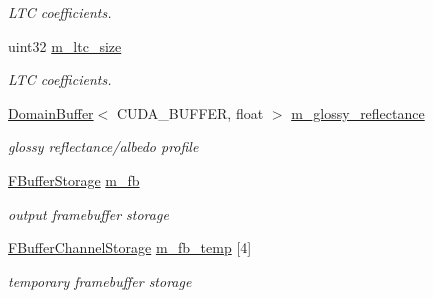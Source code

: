 \begin{DoxyCompactItemize}
\begin{DoxyCompactList}\small\item\em L\+TC coefficients. \end{DoxyCompactList}\item 
\mbox{\label{struct_rendering_context_impl_a102e9af310802a0628561bb3faa6be20}} 
uint32 \hyperlink{struct_rendering_context_impl_a102e9af310802a0628561bb3faa6be20}{m\+\_\+ltc\+\_\+size}
\begin{DoxyCompactList}\small\item\em L\+TC coefficients. \end{DoxyCompactList}\item 
\mbox{\label{struct_rendering_context_impl_a92406f18fb81f56aff284e04ddf7c79a}} 
\hyperlink{class_domain_buffer}{Domain\+Buffer}$<$ C\+U\+D\+A\+\_\+\+B\+U\+F\+F\+ER, float $>$ \hyperlink{struct_rendering_context_impl_a92406f18fb81f56aff284e04ddf7c79a}{m\+\_\+glossy\+\_\+reflectance}
\begin{DoxyCompactList}\small\item\em glossy reflectance/albedo profile \end{DoxyCompactList}\item 
\mbox{\label{struct_rendering_context_impl_a22fb9fddd3be4c290d0c2df6102c4e71}} 
\hyperlink{struct_f_buffer_storage}{F\+Buffer\+Storage} \hyperlink{struct_rendering_context_impl_a22fb9fddd3be4c290d0c2df6102c4e71}{m\+\_\+fb}
\begin{DoxyCompactList}\small\item\em output framebuffer storage \end{DoxyCompactList}\item 
\mbox{\label{struct_rendering_context_impl_a4ad4f92108c2b2a667339bd1cf99ad53}} 
\hyperlink{struct_f_buffer_channel_storage}{F\+Buffer\+Channel\+Storage} \hyperlink{struct_rendering_context_impl_a4ad4f92108c2b2a667339bd1cf99ad53}{m\+\_\+fb\+\_\+temp} \mbox{[}4\mbox{]}
\begin{DoxyCompactList}\small\item\em temporary framebuffer storage \end{DoxyCompactList}\item 
\mbox{\label{struct_rendering_context_impl_af5ac9b517fc9a57af475a4f9e808597b}} 

\end{DoxyCompactItemize}
